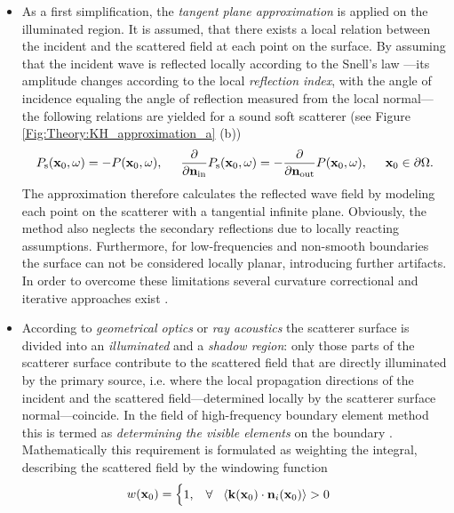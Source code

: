 \begin{itemize}
\item As a first simplification, the \emph{tangent plane approximation} is applied on the illuminated region.
It is assumed, that there exists a local relation between the incident and the scattered field at each point on the surface.
By assuming that the incident wave is reflected locally according to the Snell's law  \cite{Voronich2007}---its amplitude changes according to the local \emph{reflection index}, with the angle of incidence equaling the angle of reflection measured from the local normal---the following relations are yielded for a sound soft scatterer \cite{Bleistein1984, Bleistein2000, Pike2002} (see Figure \ref{Fig:Theory:KH_approximation_a} (b))
\begin{equation}
P_{\mathrm{s}}(\mathbf{x}_0,\omega) = -P(\mathbf{x}_0,\omega), \hspace{5mm} \frac{\partial}{\partial \mathbf{n}_{\mathrm{in}}} P_{\mathrm{s}}(\mathbf{x}_0,\omega) = -\frac{\partial}{\partial \mathbf{n}_{\mathrm{out}}} P(\mathbf{x}_0,\omega), \hspace{5mm} \mathbf{x}_0 \in \partial \Omega.
\label{Eq:SFS_theory:tangent_plane}
\end{equation}
The approximation therefore calculates the reflected wave field by modeling each point on the scatterer with a tangential infinite plane. 
Obviously, the method also neglects the secondary reflections due to locally reacting assumptions. Furthermore, for low-frequencies and non-smooth boundaries the surface can not be considered locally planar, introducing further artifacts. 
In order to overcome these limitations several curvature correctional and iterative approaches exist \cite{Elfouhaily2004}.
%
\item According to \emph{geometrical optics} or \emph{ray acoustics} the scatterer surface is divided into an \emph{illuminated} and a \emph{shadow region}: only those parts of the scatterer surface contribute to the scattered field that are directly illuminated by the primary source, i.e. where the local propagation directions of the incident and the scattered field---determined locally by the scatterer surface normal---coincide.
In the field of high-frequency boundary element method this is termed as \emph{determining the visible elements} on the boundary \cite{Herrin2003}.
Mathematically this requirement is formulated as weighting the integral, describing the scattered field by the windowing function
\begin{equation}
w(\mathbf{x}_0) = \begin{cases}
                        1, \hspace{3mm} \forall \hspace{3mm} \langle \mathbf{k}(\mathbf{x}_0) \cdot \mathbf{n}_i(\mathbf{x}_0) \rangle > 0 \\

\end{cases}
\end{equation}
\end{itemize}
